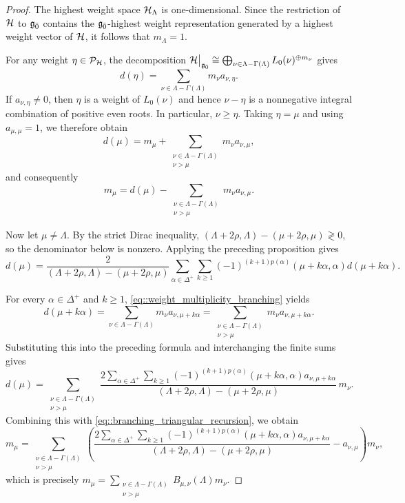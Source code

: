 \begin{proof}
The highest weight space ${\mathcal{H}}_{\Lambda}$ is one-dimensional. Since the restriction of ${\mathcal{H}}$ to ${\mathfrak{g}_{\bar{0}}}$ contains the ${\mathfrak{g}_{\bar{0}}}$-highest weight representation generated by a highest weight vector of ${\mathcal{H}}$, it follows that $m_{\Lambda}=1$.

For any weight $\eta\in \mathcal{P}_{{\mathcal{H}}}$, the decomposition
$
{\mathcal{H}}\big\vert_{{\mathfrak{g}_{\bar{0}}}}
\cong
\bigoplus_{\nu\in\Lambda-\Gamma(\Lambda)}
L_0(\nu)^{\oplus m_\nu}
$
gives
\begin{equation}\label{eq::weight_multiplicity_branching}
d(\eta)
=
\sum_{\nu\in\Lambda-\Gamma(\Lambda)}
m_\nu a_{\nu,\eta}.
\end{equation}
If $a_{\nu,\eta}\neq0$, then $\eta$ is a weight of $L_0(\nu)$ and hence $\nu-\eta$ is a nonnegative integral combination of positive even roots. In particular, $\nu\geq\eta$. Taking $\eta=\mu$ and using $a_{\mu,\mu}=1$, we therefore obtain
\[
d(\mu)
=
m_\mu+
\sum_{\substack{\nu\in\Lambda-\Gamma(\Lambda)\\ \nu>\mu}}
m_\nu a_{\nu,\mu},
\]
and consequently
\begin{equation}\label{eq::branching_triangular_recursion}
m_\mu
=
d(\mu)-
\sum_{\substack{\nu\in\Lambda-\Gamma(\Lambda)\\ \nu>\mu}}
m_\nu a_{\nu,\mu}.
\end{equation}

Now let $\mu\neq\Lambda$. By the strict Dirac inequality,
$
(\Lambda+2\rho,\Lambda)-(\mu+2\rho,\mu)\gtrless 0,
$
so the denominator below is nonzero. Applying the preceding proposition gives
\[
d(\mu)
=
\frac{2}{(\Lambda+2\rho,\Lambda)-(\mu+2\rho,\mu)}
\sum_{\alpha\in\Delta^+}\sum_{k\geq1}
(-1)^{(k+1)p(\alpha)}
(\mu+k\alpha,\alpha)d(\mu+k\alpha).
\]


For every $\alpha\in\Delta^+$ and $k\geq1$, \eqref{eq::weight_multiplicity_branching} yields
\[
d(\mu+k\alpha)
=
\sum_{\nu\in\Lambda-\Gamma(\Lambda)}
m_\nu a_{\nu,\mu+k\alpha}= \sum_{\substack{\nu\in\Lambda-\Gamma(\Lambda)\\ \nu>\mu}}
m_\nu a_{\nu,\mu+k\alpha}.
\]
Substituting this into the preceding formula and interchanging the finite sums gives
\[
d(\mu)
=
\sum_{\substack{\nu\in\Lambda-\Gamma(\Lambda)\\ \nu>\mu}}
\frac{2\displaystyle\sum_{\alpha\in\Delta^+}\sum_{k\geq1}
(-1)^{(k+1)p(\alpha)}
(\mu+k\alpha,\alpha)a_{\nu,\mu+k\alpha}}
{(\Lambda+2\rho,\Lambda)-(\mu+2\rho,\mu)}
\,m_\nu.
\]
Combining this with \eqref{eq::branching_triangular_recursion}, we obtain
\[
m_\mu
=
\sum_{\substack{\nu\in\Lambda-\Gamma(\Lambda)\\ \nu>\mu}}
\left(
\frac{2\displaystyle\sum_{\alpha\in\Delta^+}\sum_{k\geq1}
(-1)^{(k+1)p(\alpha)}
(\mu+k\alpha,\alpha)a_{\nu,\mu+k\alpha}}
{(\Lambda+2\rho,\Lambda)-(\mu+2\rho,\mu)}
-a_{\nu,\mu}
\right)m_\nu,
\]
which is precisely
$
m_\mu
=
\sum_{\substack{\nu\in\Lambda-\Gamma(\Lambda)\\ \nu>\mu}}
B_{\mu,\nu}(\Lambda)m_\nu$.
\end{proof}

